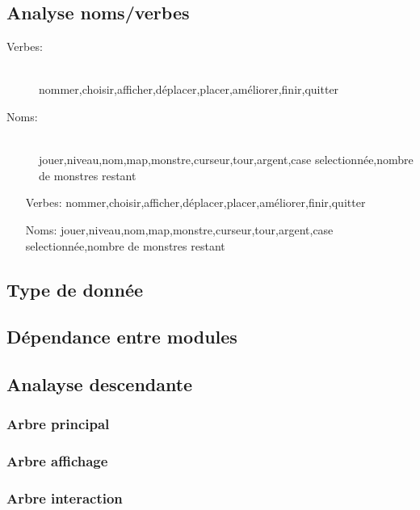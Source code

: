 \documentclass{article}
\begin{document}
        \subsection{Analyse noms/verbes}
        \begin{description}
            \item[Verbes:] \hfill \\
            nommer,choisir,afficher,déplacer,placer,améliorer,finir,quitter
            \item[Noms:] \hfill \\
            jouer,niveau,nom,map,monstre,curseur,tour,argent,case selectionnée,nombre de monstres restant
           
            \end{description}
        \begin{itemize}

        \item[Verbes:]nommer,choisir,afficher,déplacer,placer,améliorer,finir,quitter
        \item[Noms:]jouer,niveau,nom,map,monstre,curseur,tour,argent,case selectionnée,nombre de monstres restant
        \end{itemize}
        \subsection{Type de donnée}

        \subsection{Dépendance entre modules}
        \subsection{Analayse descendante}
            \subsubsection{Arbre principal}
            \begin{alltt}
            
            \end{alltt}
            \subsubsection{Arbre affichage}
            \subsubsection{Arbre interaction}
\end{document}
